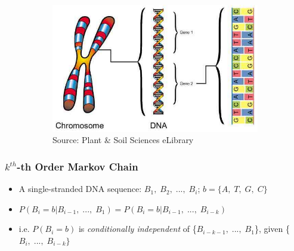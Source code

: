 \documentclass[xcolor=dvipsnames]{beamer} \usepackage{beamerthemesplit}
\begin{document}
\begin{frame}
\begin{figure}
\begin{subfigure}[b]{.74\textwidth}
	  \includegraphics[width=\textwidth]{ChromgendnaLG.jpg}\\
	  \tiny{Source: Plant \& Soil Sciences eLibrary}
	  \label{fig:chrm}
	\end{subfigure}
	
	\label{fig:orgm_chrm}
	\end{figure}
\end{frame}	

\begin{frame}
	\frametitle{$k^{th}$-th Order Markov Chain}
	\begin{itemize}
		\item A single-stranded DNA sequence: $B_1,\;B_2,\;...,\;B_i$; $b=\{A,\;T,\;G,\;C\}$
		\item $P(B_i=b|B_{i-1},\;...,\;B_1)=P(B_i=b|B_{i-1},\;...,\;B_{i-k})$ \\
		\item i.e. $P(B_i=b)$ is \emph{conditionally independent} of \{$B_{i-k-1},\;...,\;B_1$\}, given \{$B_i,\;...,\;B_{i-k}\}$
	\end{itemize}
	
\end{frame}
\end{document}

